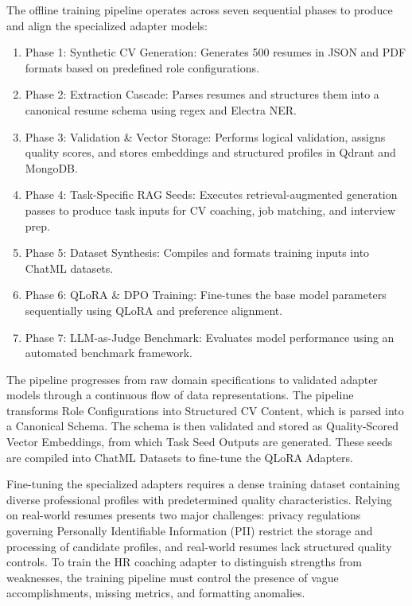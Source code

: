 \documentclass[12pt, a4paper]{report}
\begin{document}
The offline training pipeline operates across seven sequential phases to produce and align the specialized adapter models:
\begin{enumerate}
    \item Phase 1: Synthetic CV Generation: Generates 500 resumes in JSON and PDF formats based on predefined role configurations.
    \item Phase 2: Extraction Cascade: Parses resumes and structures them into a canonical resume schema using regex and Electra NER.
    \item Phase 3: Validation \& Vector Storage: Performs logical validation, assigns quality scores, and stores embeddings and structured profiles in Qdrant and MongoDB.
    \item Phase 4: Task-Specific RAG Seeds: Executes retrieval-augmented generation passes to produce task inputs for CV coaching, job matching, and interview prep.
    \item Phase 5: Dataset Synthesis: Compiles and formats training inputs into ChatML datasets.
    \item Phase 6: QLoRA \& DPO Training: Fine-tunes the base model parameters sequentially using QLoRA and preference alignment.
    \item Phase 7: LLM-as-Judge Benchmark: Evaluates model performance using an automated benchmark framework.
\end{enumerate}

The pipeline progresses from raw domain specifications to validated adapter models through a continuous flow of data representations. The pipeline transforms Role Configurations into Structured CV Content, which is parsed into a Canonical Schema. The schema is then validated and stored as Quality-Scored Vector Embeddings, from which Task Seed Outputs are generated. These seeds are compiled into ChatML Datasets to fine-tune the QLoRA Adapters.

\vspace{0.6cm}
\vspace{0.4cm}

\vspace{0.3cm}

Fine-tuning the specialized adapters requires a dense training dataset containing diverse professional profiles with predetermined quality characteristics. Relying on real-world resumes presents two major challenges: privacy regulations governing Personally Identifiable Information (PII) restrict the storage and processing of candidate profiles, and real-world resumes lack structured quality controls. To train the HR coaching adapter to distinguish strengths from weaknesses, the training pipeline must control the presence of vague accomplishments, missing metrics, and formatting anomalies.
\end{document}

